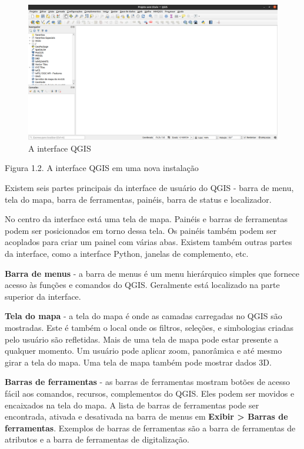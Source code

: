 \documentclass[
]{krantz}
\begin{document}
\begin{figure}
\centering
\includegraphics{media/modulo1/qgis-interface.png}
\caption{A interface QGIS}
\end{figure}

Figura 1.2. A interface QGIS em uma nova instalação

Existem seis partes principais da interface de usuário do QGIS - barra de menu, tela do mapa, barra de ferramentas, painéis, barra de status e localizador.

No centro da interface está uma tela de mapa. Painéis e barras de ferramentas podem ser posicionados em torno dessa tela. Os painéis também podem ser acoplados para criar um painel com várias abas. Existem também outras partes da interface, como a interface Python, janelas de complemento, etc.

\textbf{Barra de menus} - a barra de menus é um menu hierárquico simples que fornece acesso às funções e comandos do QGIS. Geralmente está localizado na parte superior da interface.

\textbf{Tela do mapa} - a tela do mapa é onde as camadas carregadas no QGIS são mostradas. Este é também o local onde os filtros, seleções, e simbologias criadas pelo usuário são refletidas. Mais de uma tela de mapa pode estar presente a qualquer momento. Um usuário pode aplicar zoom, panorâmica e até mesmo girar a tela do mapa. Uma tela de mapa também pode mostrar dados 3D.

\textbf{Barras de ferramentas} - as barras de ferramentas mostram botões de acesso fácil aos comandos, recursos, complementos do QGIS. Eles podem ser movidos e encaixados na tela do mapa. A lista de barras de ferramentas pode ser encontrada, ativada e desativada na barra de menus em \textbf{Exibir \textgreater{} Barras de ferramentas}. Exemplos de barras de ferramentas são a barra de ferramentas de atributos e a barra de ferramentas de digitalização.
\end{document}
